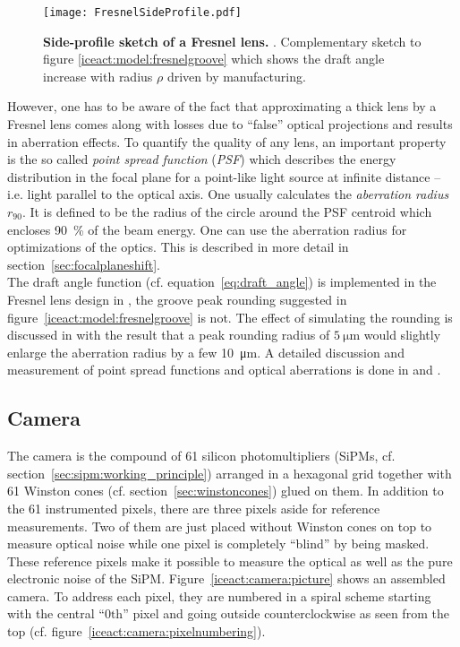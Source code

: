 \begin{figure}[H]
	\centering
	\texttt{[image: FresnelSideProfile.pdf]}
	\caption[Fresnel side-profile]{\textbf{Side-profile sketch of a Fresnel lens.} \cite[adapted]{iceact:fresnellens:design}. Complementary sketch to figure \ref{iceact:model:fresnelgroove} which shows the draft angle increase with radius $\rho$ driven by manufacturing.}
	\label{iceact:model:fresnelprofile}	
\end{figure}

However, one has to be aware of the fact that approximating a thick lens by a Fresnel lens comes along with losses due to \enquote{false} optical projections and results in aberration effects. To quantify the quality of any lens, an important property is the so called \textit{point spread function} (\textit{PSF}) which describes the energy distribution in the focal plane for a point-like light source at infinite distance -- i.e. light parallel to the optical axis. One usually calculates the \textit{aberration radius} $r_{90}$. It is defined to be the radius of the circle around the PSF centroid which encloses \SI{90}{\percent} of the beam energy. One can use the aberration radius for optimizations of the optics. This is described in more detail in section~\ref{sec:focalplaneshift}.\\

The draft angle function (cf. equation~\eqref{eq:draft_angle}) is implemented in the Fresnel lens design in \geant, the groove peak rounding suggested in figure~\ref{iceact:model:fresnelgroove} is not. The effect of simulating the rounding is discussed in \cite{famous:eichler} with the result that a peak rounding radius of $\SI{5}{\micro\meter}$ would slightly enlarge the aberration radius by a few \SI{10}{\micro\meter}. A detailed discussion and measurement of point spread functions and optical aberrations is done in \cite{famous:niggemann} and \cite{famous:eichler}.
\newpage

\subsection{Camera}\label{iceact:model:camera}

The \iceact camera is the compound of 61 silicon photomultipliers (SiPMs, cf. section~\ref{sec:sipm:working_principle}) arranged in a hexagonal grid together with 61 Winston cones (cf. section~\ref{sec:winstoncones}) glued on them. In addition to the 61 instrumented pixels, there are three pixels aside for reference measurements. Two of them are just placed without Winston cones on top to measure optical noise while one pixel is completely \enquote{blind} by being masked. These reference pixels make it possible to measure the optical as well as the pure electronic noise of the SiPM. Figure~\ref{iceact:camera:picture} shows an assembled \iceact camera. To address each pixel, they are numbered in a spiral scheme starting with the central \enquote{0$\text{th}$} pixel and going outside counterclockwise as seen from the top (cf. figure~\ref{iceact:camera:pixelnumbering}).\\

